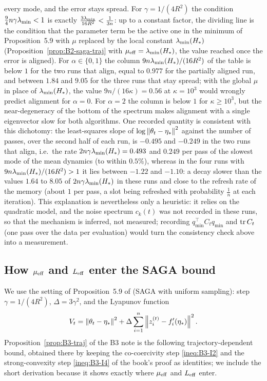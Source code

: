 \begin{remark}
every mode, and the error stays spread. For $\gamma=1/(4R^2)$ the condition $\frac94n\gamma\lambda_{\min}<1$ is exactly
$\frac{3\lambda_{\min}}{16R^2}<\frac1{3n}$: up to a constant factor, the dividing line is the condition that the parameter term be
the active one in the minimum of Proposition~5.9 with $\mu$ replaced by the local constant $\lambda_{\min}(H_\ast)$
(Proposition~\ref{prop:B2-saga-traj} with $\mu_{\mathrm{eff}}=\lambda_{\min}(H_\ast)$, the value reached once the error is aligned). For
$\alpha\in\{0,1\}$ the column $9n\lambda_{\min}(H_\ast)/(16R^2)$ of the table is below $1$ for the two runs that align, equal to
$0.977$ for the partially aligned run, and between $1.84$ and $9.05$ for the three runs that stay spread; with the global
$\mu$ in place of $\lambda_{\min}(H_\ast)$, the value $9n/(16\kappa)=0.56$ at $\kappa=10^3$ would wrongly predict alignment for
$\alpha=0$. For $\alpha=2$ the column is below $1$ for $\kappa\ge10^3$, but the near-degeneracy of the bottom of the
spectrum makes alignment with a single eigenvector slow for both algorithms. One recorded quantity is consistent with
this dichotomy: the least-squares slope of $\log\left\|\theta_t-\eta_\ast\right\|^2$ against the number of passes, over the second
half of each run, is $-0.495$ and $-0.249$ in the two runs that align, i.e.\ the rate $2n\gamma\lambda_{\min}(H_\ast)=0.493$ and
$0.249$ per pass of the slowest mode of the mean dynamics (to within $0.5\%$), whereas in the four runs with
$9n\lambda_{\min}(H_\ast)/(16R^2)>1$ it lies between $-1.22$ and $-1.10$: a decay slower than the values $1.64$ to $8.05$ of
$2n\gamma\lambda_{\min}(H_\ast)$ in these runs and close to the refresh rate of the memory (about $1$ per pass, a slot being
refreshed with probability $\frac1n$ at each iteration). This explanation is nevertheless only a heuristic: it relies on
the quadratic model, and the noise spectrum $c_k(t)$ was not recorded in these runs, so that the mechanism is inferred,
not measured; recording $q_{\min}^\top C_tq_{\min}$ and $\operatorname{tr} C_t$ (one pass over the data per evaluation) would turn the
consistency check above into a measurement.
\end{remark}

\subsection{How \texorpdfstring{$\mu_{\mathrm{eff}}$}{mu\_eff} and \texorpdfstring{$L_{\mathrm{eff}}$}{L\_eff} enter the SAGA bound}\label{sec:B2-saga-bound}

We use the setting of Proposition~5.9 of \cite{bach2024learning} (SAGA \cite{defazio2014saga} with
uniform sampling): step $\gamma=1/(4R^2)$, $\Delta=3\gamma^2$, and the Lyapunov function
\[
V_t=\left\|\theta_t-\eta_\ast\right\|^2+\Delta\sum_{i=1}^n\left\|z_i^{(t)}-f'_i(\eta_\ast)\right\|^2 .
\]
Proposition~\ref{prop:B3-traj} of the B3 note is the following trajectory-dependent bound, obtained there by keeping
the co-coercivity step \eqref{ineq:B3-I2} and the strong-convexity step \eqref{ineq:B3-I4} of the book's proof as
identities; we include the short derivation because it shows exactly where $\mu_{\mathrm{eff}}$ and $L_{\mathrm{eff}}$ enter.

